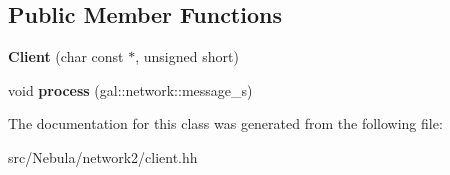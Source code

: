 \subsection*{\-Public \-Member \-Functions}
\begin{DoxyCompactItemize}
\item 
\hypertarget{classNeb_1_1Network_1_1Client_af42cd86a3ba20320503b774b4081ef20}{{\bfseries \-Client} (char const $\ast$, unsigned short)}\label{classNeb_1_1Network_1_1Client_af42cd86a3ba20320503b774b4081ef20}

\item 
\hypertarget{classNeb_1_1Network_1_1Client_a319d1d9e967e026b32b4124698a87e18}{void {\bfseries process} (gal\-::network\-::message\-\_\-s)}\label{classNeb_1_1Network_1_1Client_a319d1d9e967e026b32b4124698a87e18}

\end{DoxyCompactItemize}


\-The documentation for this class was generated from the following file\-:\begin{DoxyCompactItemize}
\item 
src/\-Nebula/network2/client.\-hh\end{DoxyCompactItemize}
